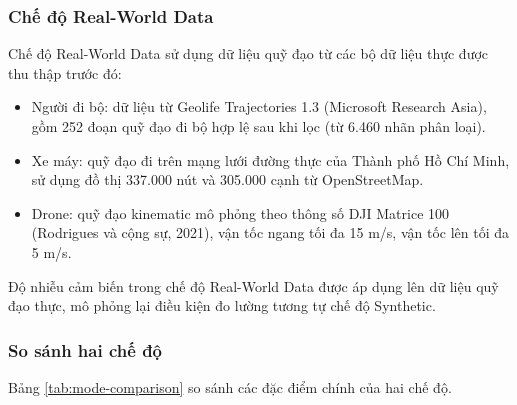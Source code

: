 \subsubsection{Chế độ Real-World Data}

\hspace{0.5cm} Chế độ Real-World Data sử dụng dữ liệu quỹ đạo từ các bộ dữ liệu thực được thu thập trước đó:
\begin{itemize}
\item Người đi bộ: dữ liệu từ Geolife Trajectories 1.3 (Microsoft Research Asia), gồm 252 đoạn quỹ đạo đi bộ hợp lệ sau khi lọc (từ 6.460 nhãn phân loại).
\item Xe máy: quỹ đạo đi trên mạng lưới đường thực của Thành phố Hồ Chí Minh, sử dụng đồ thị 337.000 nút và 305.000 cạnh từ OpenStreetMap.
\item Drone: quỹ đạo kinematic mô phỏng theo thông số DJI Matrice 100 (Rodrigues và cộng sự, 2021), vận tốc ngang tối đa 15 m/s, vận tốc lên tối đa 5 m/s.
\end{itemize}

Độ nhiễu cảm biến trong chế độ Real-World Data được áp dụng lên dữ liệu quỹ đạo thực, mô phỏng lại điều kiện đo lường tương tự chế độ Synthetic.

\subsubsection{So sánh hai chế độ}

\hspace{0.5cm} Bảng \ref{tab:mode-comparison} so sánh các đặc điểm chính của hai chế độ.

\begin{table}[H]
\centering
\caption{So sánh chế độ Synthetic và Real-World Data}
\label{tab:mode-comparison}
\end{table}



